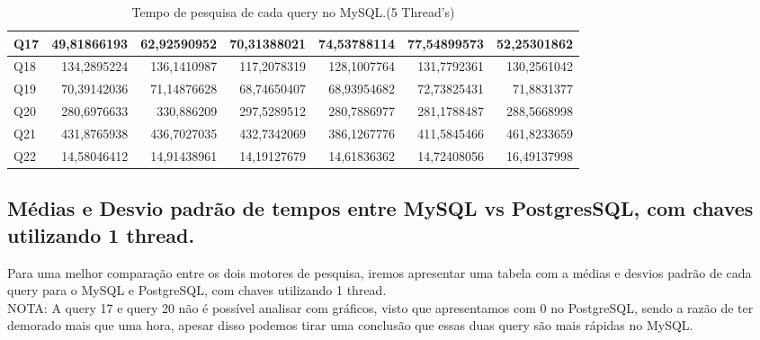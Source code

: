 \documentclass{article}
\begin{document}
\begin{table}[H]
{\begin{tabular}{|l|r|r|r|r|r|r|}
        Q17	&49,81866193&	62,92590952	&70,31388021	&74,53788114&	77,54899573&	52,25301862\\ \hline
        Q18	&134,2895224&	136,1410987	&117,2078319	&128,1007764&	131,7792361	&130,2561042\\ \hline
        Q19	&70,39142036&	71,14876628	&68,74650407	&68,93954682&	72,73825431	&71,8831377\\ \hline
        Q20	&280,6976633&	330,886209&	297,5289512	&280,7886977&	281,1788487&	288,5668998\\ \hline
        Q21	&431,8765938&	436,7027035	&432,7342069&	386,1267776&	411,5845466	&461,8233659\\ \hline
        Q22	&14,58046412&	14,91438961	&14,19127679	&14,61836362&	14,72408056	&16,49137998 \\ \hline
 \end{tabular}}
    \caption{Tempo de pesquisa de cada query no MySQL.(5 Thread's)}
    \label{tab:BC_Table6}
  \end{table}

\subsection{Médias e Desvio padrão de tempos entre MySQL vs PostgresSQL, com chaves utilizando 1 thread.}

\quad Para uma melhor comparação entre os dois motores de pesquisa, iremos apresentar uma tabela com a médias e desvios padrão de cada query para o MySQL e PostgreSQL, com chaves utilizando 1 thread. \\
NOTA: A query 17 e query 20 não é possível analisar com gráficos, visto que apresentamos com 0 no PostgreSQL, sendo a razão de ter demorado mais que uma hora, apesar disso podemos tirar uma conclusão que essas duas query são mais rápidas no MySQL.
\end{document}

